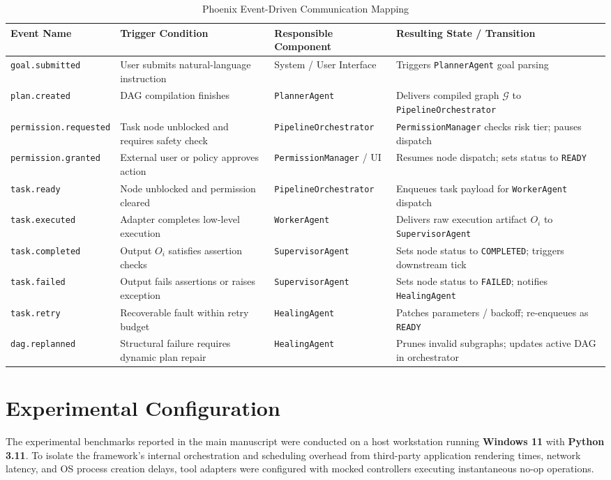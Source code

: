 \documentclass[conference]{IEEEtran}
\begin{document}
\begin{table}[htbp]
\caption{Phoenix Event-Driven Communication Mapping}
\label{tab:event_mapping}
\centering
\begin{tabular}{p{3.2cm} p{4.8cm} p{3.2cm} p{4.8cm}}
\toprule
\textbf{Event Name} & \textbf{Trigger Condition} & \textbf{Responsible Component} & \textbf{Resulting State / Transition} \\
\midrule
\texttt{goal.submitted} & User submits natural-language instruction & System / User Interface & Triggers \texttt{PlannerAgent} goal parsing \\
\texttt{plan.created} & DAG compilation finishes & \texttt{PlannerAgent} & Delivers compiled graph $\mathcal{G}$ to \texttt{PipelineOrchestrator} \\
\texttt{permission.requested} & Task node unblocked and requires safety check & \texttt{PipelineOrchestrator} & \texttt{PermissionManager} checks risk tier; pauses dispatch \\
\texttt{permission.granted} & External user or policy approves action & \texttt{PermissionManager} / UI & Resumes node dispatch; sets status to \texttt{READY} \\
\texttt{task.ready} & Node unblocked and permission cleared & \texttt{PipelineOrchestrator} & Enqueues task payload for \texttt{WorkerAgent} dispatch \\
\texttt{task.executed} & Adapter completes low-level execution & \texttt{WorkerAgent} & Delivers raw execution artifact $O_i$ to \texttt{SupervisorAgent} \\
\texttt{task.completed} & Output $O_i$ satisfies assertion checks & \texttt{SupervisorAgent} & Sets node status to \texttt{COMPLETED}; triggers downstream tick \\
\texttt{task.failed} & Output fails assertions or raises exception & \texttt{SupervisorAgent} & Sets node status to \texttt{FAILED}; notifies \texttt{HealingAgent} \\
\texttt{task.retry} & Recoverable fault within retry budget & \texttt{HealingAgent} & Patches parameters / backoff; re-enqueues as \texttt{READY} \\
\texttt{dag.replanned} & Structural failure requires dynamic plan repair & \texttt{HealingAgent} & Prunes invalid subgraphs; updates active DAG in orchestrator \\
\bottomrule
\end{tabular}
\end{table}

\section{Experimental Configuration}
\label{sec:experimental_setup}
The experimental benchmarks reported in the main manuscript were conducted on a host workstation running \textbf{Windows 11} with \textbf{Python 3.11}. To isolate the framework's internal orchestration and scheduling overhead from third-party application rendering times, network latency, and OS process creation delays, tool adapters were configured with mocked controllers executing instantaneous no-op operations.
\end{document}
